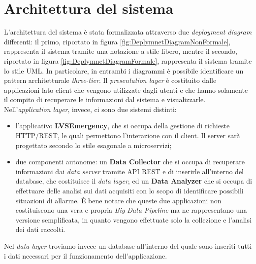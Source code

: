 \clearpage
\section{Architettura del sistema}
L'architettura del sistema è stata formalizzata attraverso due \textit{deployment diagram} differenti: il primo, riportato in figura \ref{fig:DeplymnetDiagramNonFormale}, rappresenta il sistema tramite una notazione a stile libero, mentre il secondo, riportato in figura \ref{fig:DeplymnetDiagramFormale}, rappresenta il sistema tramite lo stile UML. In particolare, in entrambi i diagrammi è possibile identificare un pattern architetturale \textit{three-tier}. Il \textit{presentation layer} è costituito dalle applicazioni lato client che vengono utilizzate dagli utenti e che hanno solamente il compito di recuperare le informazioni dal sistema e visualizzarle. Nell'\textit{application layer}, invece, ci sono due sistemi distinti:

\begin{itemize}
	\item l'applicativo \textbf{LVSEmergency}, che si occupa della gestione di richieste HTTP/REST, le quali permettono l'interazione con il client. Il server sarà progettato secondo lo stile esagonale a microservizi;
	\item due componenti autonome: un \textbf{Data Collector} che si occupa di recuperare informazioni dai \textit{data server} tramite API REST e di inserirle all'interno del database, che costituisce il \textit{data layer}, ed un \textbf{Data Analyzer} che si occupa di effettuare delle analisi sui dati acquisiti con lo scopo di identificare possibili situazioni di allarme. È bene notare che queste due applicazioni non costituiscono una vera e propria \textit{Big Data Pipeline} ma ne rappresentano una versione semplificata, in quanto vengono effettuate solo la collezione e l'analisi dei dati raccolti.
\end{itemize}

Nel \textit{data layer} troviamo invece un database all'interno del quale sono inseriti tutti i dati necessari per il funzionamento dell'applicazione.

